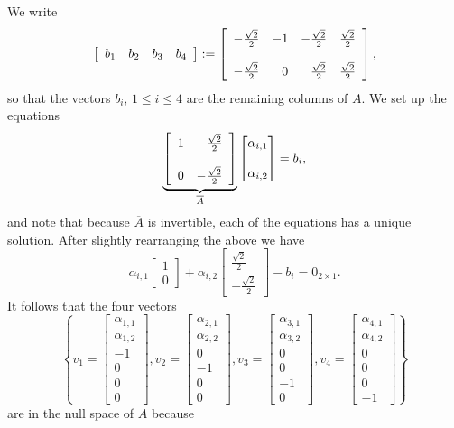 We write 
$$\left[ \begin{array}{rrrr}  b_1 & b_2 & b_3 & b_4 \end{array} \right] := \left[\begin{array}{rrrr}  -\frac{\sqrt{2}}{2} & -1 & -\frac{\sqrt{2}}{2} & \frac{\sqrt{2}}{2} \bigskip \\
     -\frac{\sqrt{2}}{2} & 0 & \frac{\sqrt{2}}{2} & \frac{\sqrt{2}}{2} \end{array} \right],$$
      so that the vectors $b_i$, $1 \le i \le 4$ are the remaining columns of $A$. We set up the equations
      $$\underbrace{\left[\begin{array}{rr}  1 & \frac{\sqrt{2}}{2} \bigskip \\ 0 & -\frac{\sqrt{2}}{2} \end{array} \right]}_{\overline{A}} \begin{bmatrix} \alpha_{i,1} \\ \\ \alpha_{i,2}  \end{bmatrix} = b_i,$$
     and note that because $\overline{A}$ is invertible, each of the equations has a unique solution. After slightly rearranging the above we have 
     $$  \alpha_{i,1} \left[\begin{array}{r}  1\\ 0 \end{array} \right] + \alpha_{i,2} \left[\begin{array}{r}  \frac{\sqrt{2}}{2}\\ -\frac{\sqrt{2}}{2} \end{array} \right] - b_i = 0_{2 \times 1}.$$
     It follows that the four vectors 
     $$ \left\{ v_1 = \left[ \begin{array}{r} \alpha_{1,1}  \\ \alpha_{1,2} \\ -1 ~~\\ 0 ~~\\ 0 ~~\\ 0 ~~\end{array} \right], v_2 = \left[ \begin{array}{r} \alpha_{2,1}  \\ \alpha_{2,2} \\ 0 ~~\\ -1~~\\ 0~~\\ 0~~\end{array} \right], v_3 = \left[ \begin{array}{r} \alpha_{3,1}  \\ \alpha_{3,2} \\ 0 ~~\\ 0~~\\ -1~~\\ 0~~\end{array} \right], v_4 =  \left[ \begin{array}{r} \alpha_{4,1}  \\ \alpha_{4,2} \\ 0~~ \\ 0~~\\ 0~~\\ -1~~\end{array} \right]  \right\}$$
     are in the null space of $A$ because 
     
